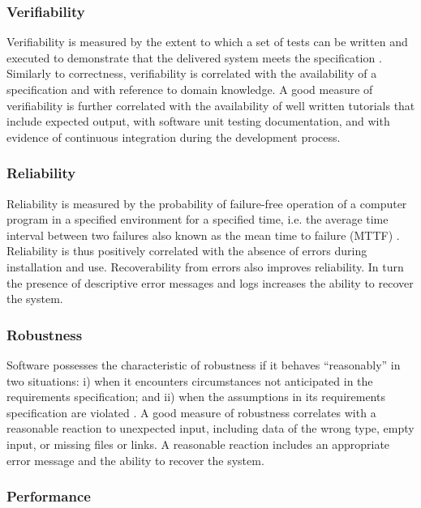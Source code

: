 \documentclass[12pt, notitlepage]{article}
\begin{document}
\subsubsection{Verifiability}

Verifiability is measured by the extent to which a set of tests can be written and executed to demonstrate that the delivered system meets the specification \citep{sommerville}. Similarly to correctness, verifiability is correlated with the availability of a specification and with reference to domain knowledge. A good measure of verifiability is further correlated with the availability of well written tutorials that include expected output, with software unit testing documentation, and with evidence of continuous integration during the development process. 

\subsubsection{Reliability}

Reliability is measured by the probability of failure-free operation of a computer program in a specified environment for a specified time, i.e. the average time interval between two failures also known as the mean time to failure (MTTF) \citep{GhezziEtAl2003} \citep{musa1987software}. Reliability is thus positively correlated with the absence of errors during installation and use. Recoverability from errors also improves reliability. In turn the presence of descriptive error messages and logs increases the ability to recover the system.

\subsubsection{Robustness}

Software possesses the characteristic of robustness if it behaves “reasonably” in two situations: i) when it encounters circumstances not anticipated in the requirements specification; and ii) when the assumptions in its requirements specification are violated \citep{boehm2007software} \citep{ghezzi1991fundamentals}. A good measure of robustness correlates with a reasonable reaction to unexpected input, including data of the wrong type, empty input, or missing files or links. A reasonable reaction includes an appropriate error message and the ability to recover the system.

\subsubsection{Performance}
\end{document}
